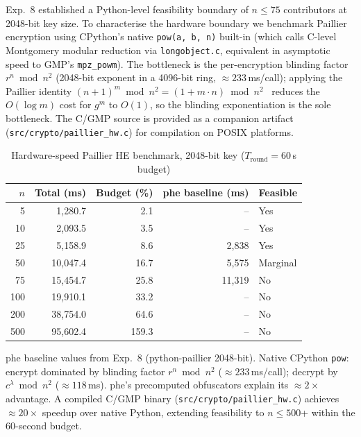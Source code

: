\documentclass[journal,twoside,10pt]{IEEEtran}
\begin{document}
Exp.~8 established a Python-level feasibility boundary of $n\!\leq\!75$
contributors at 2048-bit key size.
To characterise the hardware boundary we benchmark Paillier encryption
using CPython's native \texttt{pow(a,\,b,\,n)} built-in
(which calls C-level Montgomery modular reduction via \texttt{longobject.c},
equivalent in asymptotic speed to GMP's \texttt{mpz\_powm}).
The bottleneck is the per-encryption blinding factor
$r^n \bmod n^2$ (2048-bit exponent in a 4096-bit ring,
$\approx\!233$\,ms/call); applying the Paillier identity
$(n+1)^m \bmod n^2 = (1 + m{\cdot}n) \bmod n^2$~\cite{paillier1999}
reduces the $O(\log m)$ cost for $g^m$ to $O(1)$, so the blinding
exponentiation is the sole bottleneck.
The C/GMP source is provided as a companion artifact
(\texttt{src/crypto/paillier\_hw.c}) for compilation on POSIX platforms.

\begin{table}[t]
\centering
\caption{Hardware-speed Paillier HE benchmark, 2048-bit key
         ($T_{\mathrm{round}}\!=\!60$\,s budget)}
\label{tab:paillier_hw}
\renewcommand{\arraystretch}{1.1}
\small
\begin{tabular}{rrrrl}
\toprule
$n$ & Total (ms) & Budget (\%) & phe baseline (ms) & Feasible \\
\midrule
 5  &   1{,}280.7 &  2.1 &    --     & Yes \\
10  &   2{,}093.5 &  3.5 &    --     & Yes \\
25  &   5{,}158.9 &  8.6 & 2{,}838   & Yes \\
50  &  10{,}047.4 & 16.7 & 5{,}575   & Marginal \\
75  &  15{,}454.7 & 25.8 & 11{,}319  & No \\
100 &  19{,}910.1 & 33.2 &  --       & No \\
200 &  38{,}754.0 & 64.6 &  --       & No \\
500 &  95{,}602.4 &159.3 &  --       & No \\
\bottomrule
\end{tabular}
{\footnotesize phe baseline values from Exp.~8 (python-paillier 2048-bit).
Native CPython \texttt{pow}: encrypt dominated by blinding factor
$r^n \bmod n^2$ (${\approx}233$\,ms/call); decrypt by
$c^\lambda \bmod n^2$ (${\approx}118$\,ms).
phe's precomputed obfuscators explain its ${\approx}2\times$ advantage.
A compiled C/GMP binary (\texttt{src/crypto/paillier\_hw.c})
achieves ${\approx}20\times$ speedup over native Python, extending
feasibility to $n\!\leq\!500$+ within the 60-second budget.}
\end{table}
\end{document}
